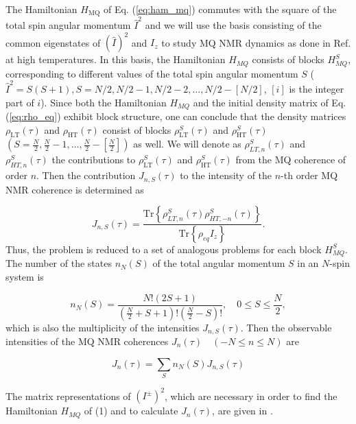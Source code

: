 The Hamiltonian $H_\mathrm{MQ}$ of Eq.   (\ref{eq:ham_mq}) commutes with the square of the total spin angular momentum $\hat I^2$ and we will use the basis consisting of the common eigenstates of $(\hat I)^2$ and $I_z$ to study MQ NMR dynamics as done in Ref.\cite{lab:mq_nmr_dyn_in_nanopores_2009} at high temperatures. In this basis, the Hamiltonian $H_{MQ}$ consists of blocks $H_{MQ}^S$, corresponding to different values of the total spin angular momentum $S$ ($\hat I^2 = S(S+1), S = N/2, N/2-1, N/2-2, \dots, N/2 - [N/2]$, $[i]$ is the integer part of $i$).
Since both the Hamiltonian $H_{MQ}$  and the initial density matrix of Eq.   (\ref{eq:rho_eq}) exhibit block structure, one can conclude that the density matrices $\rho_\mathrm{LT}(\tau)$ and $\rho_\mathrm{HT}(\tau)$ consist of blocks $\rho^S_\mathrm{LT}(\tau)$ and $\rho^S_\mathrm{HT}(\tau)$ $(S=\frac N 2, \frac N 2 - 1, \dots, \frac N 2 - \left[\frac N 2\right])$ as well. We will denote as $\rho^S_{LT, n}(\tau)$ and $\rho^S_{HT, n}(\tau)$ the contributions to $\rho^S_\mathrm{LT}(\tau)$ and $\rho^S_\mathrm{HT}(\tau)$ from the MQ coherence of order $n$. Then the contribution $J_{n, S}(\tau)$ to the intensity of the $n$-th order MQ NMR coherence is determined as 

\begin{equation}
    \label{eq:coherence_k_s}
    J_{n, S}(\tau) = \dfrac{\mathrm{Tr}\left\{
        \rho_{LT, n}^S(\tau)\rho_{HT, -n}^S(\tau)
    \right\}}
    {\mathrm{Tr}\left\{\rho_{eq} I_z\right\}}.
\end{equation}
Thus, the problem is reduced to a set of analogous problems for each block $H_{MQ}^S$. The number of the states $n_N(S)$ of the total angular momentum $S$ in an $N$-spin system is \cite{Landau}

\begin{equation}
    \label{eq:coeff_n}
    n_N(S)  = \dfrac{ N! (2S+1)}
    {(\frac N 2 + S + 1)!(\frac N 2 - S)!}, 
    \quad
    0\leq S \leq \frac N 2, 
\end{equation}
which is also the multiplicity of the intensities $J_{n, S}(\tau)$. Then the observable intensities of the  MQ NMR coherences $J_n(\tau)\quad(-N\leq n \leq N)$ are 

\begin{equation}
    \label{eq:coherence_k}
    J_n(\tau) = \sum\limits_S n_N(S) J_{n, S}(\tau)
\end{equation}

The matrix representations of $(I^{\pm})^2$, which are necessary in order to find the Hamiltonian $H_{MQ}$ of (1) and to calculate $J_n(\tau)$, are given in \cite{lab:mq_nmr_dyn_in_nanopores_2009}. 

